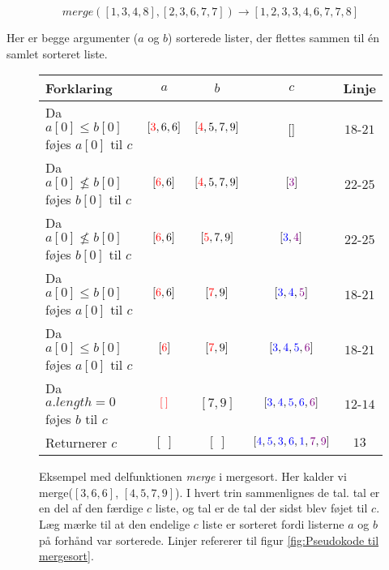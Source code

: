$$merge([1,3,4,8],[2,3,6,7,7]) \longrightarrow [1, 2, 3, 3, 4, 6, 7, 7, 8]$$

Her er begge argumenter ($a$ og $b$) sorterede lister, der flettes sammen til én samlet sorteret liste.\\



\begin{figure}
	\begin{center}
		\padtable
		\begin{tabular}{l|c|c|c|c}
			Forklaring & $a$ & $b$ & $c$ & Linje\\
			\hline
			 Da $a[0] \leq b[0]$ føjes $a[0]$ til $c$ & $[\color{red}3\color{black},6,6]$ & $[\color{red}4\color{black},5,7,9]$ & [\:] & $18$-$21$\\
			 Da $a[0] \nleq b[0]$ føjes $b[0]$ til $c$ & $[\color{red}6\color{black},6]$ & $[\color{red}4\color{black},5,7,9]$ & $[\color{violet}3\color{black}]$ & $22$-$25$\\
			 Da $a[0] \nleq b[0]$ føjes $b[0]$ til $c$ & $[\color{red}6\color{black},6]$ & $[\color{red}5\color{black},7,9]$ & $[\color{blue}3\color{black},\color{violet}4\color{black}]$ & $22$-$25$\\
			 Da $a[0] \leq b[0]$ føjes $a[0]$ til $c$ & $[\color{red}6\color{black},6]$ & $[\color{red}7\color{black},9]$ & $[\color{blue}3\color{black},\color{blue}4\color{black},\color{violet}5\color{black}]$ & $18$-$21$\\
			 Da $a[0] \leq b[0]$ føjes $a[0]$ til $c$ & $[\color{red}6\color{black}]$ & $[\color{red}7\color{black},9]$ & $[\color{blue}3\color{black},\color{blue}4\color{black},\color{blue}5\color{black},\color{violet}6\color{black}]$ & $18$-$21$\\
			 Da $a.length = 0$ føjes $b$ til $c$ & $\color{red}[\:]\color{black}$ & $[7,9]$ & $[\color{blue}3\color{black},\color{blue}4\color{black},\color{blue}5\color{black},\color{blue}6\color{black},\color{violet}6\color{black}]$ & $12$-$14$\\
			 Returnerer $c$ & $[\:]$ & $[\:]$ & $[\color{blue}4\color{black},\color{blue}5\color{black},\color{blue}3\color{black},\color{blue}6\color{black},\color{blue}1\color{black},\color{violet}7\color{black},\color{violet}9\color{black}]$ & $13$\\
		\end{tabular}
	\end{center}
	\caption{Eksempel med delfunktionen \emph{merge} i mergesort. Her kalder vi merge($[3,6,6]$, $[4,5,7,9]$). I hvert trin sammenlignes de  tal. tal er en del af den færdige $c$ liste, og  tal er de tal der sidst blev føjet til $c$. Læg mærke til at den endelige $c$ liste er sorteret fordi listerne $a$ og $b$ på forhånd var sorterede. Linjer refererer til figur \ref{fig:Pseudokode til mergesort}.}
	\label{fig:merge i mergesort}
\end{figure}

